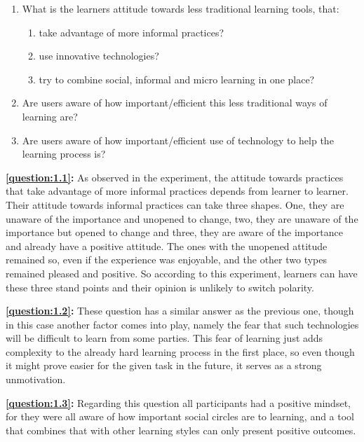 \begin{enumerate}
	
\item What is the learners attitude towards less traditional learning tools, that:
    \begin{enumerate}
        \item \label{question:1.1} 
            take advantage of more informal practices?
        \item \label{question:1.2}
            use innovative technologies?
        \item \label{question:1.3}
            try to combine social, informal and micro learning in one place?
    \end{enumerate}

\item \label{question:2} 
    Are users aware of how important/efficient this less traditional ways of learning are?
\item \label{question:3} 
    Are users aware of how important/efficient use of technology to help the learning process is?

\end{enumerate}

\textbf{\ref{question:1.1}:} As observed in the experiment, the attitude towards practices that take
advantage of more informal practices depends from learner to learner. Their attitude towards informal 
practices can take three shapes. One, they are unaware of the importance and unopened to change, two, they
are unaware of the importance but opened to change and three, they are aware of the importance and already 
have a positive attitude. The ones with the unopened attitude remained so, even if the experience was 
enjoyable, and the other two types remained pleased and positive. So according to this experiment, learners
can have these three stand points and their opinion is unlikely to switch polarity.

\textbf{\ref{question:1.2}:} These question has a similar answer as the previous one, though in this case
another factor comes into play, namely the fear that such technologies will be difficult to learn from 
some parties. This fear of learning just adds complexity to the already hard learning process in the first 
place, so even though it might prove easier for the given task in the future, it serves as a strong 
unmotivation.

\textbf{\ref{question:1.3}:} Regarding this question all participants had a positive mindset, for they were
all aware of how important social circles are to learning, and a tool that combines that with other learning
styles can only present positive outcomes.

